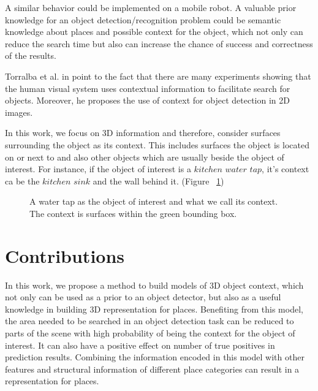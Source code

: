 A similar behavior could be implemented on a mobile robot. 
A valuable prior knowledge for an object detection/recognition problem could be semantic knowledge about places and possible context for the object, 
which not only can reduce the search time but also can increase the chance of success and correctness of the results.

Torralba et al. in \cite{eyeMovement} point to the fact that there are many experiments showing that the human visual system uses 
contextual information to facilitate search for objects. 
Moreover, he proposes the use of context for object detection in 2D images.

In this work, we focus on 3D information and therefore, consider surfaces surrounding the object as its context.
This includes surfaces the object is located on or next to and also other objects which are usually
beside the object of interest. 
For instance, if the object of interest is a $kitchen$ $water$ $tap$, it's context ca be the 
$kitchen$ $sink$ and the wall behind it. (Figure ~\ref{contextExample.figure})

\begin{figure}[t]
  \caption[Illustration of a sample Context.]
  {A water tap as the object of interest and what we call its context. The context is surfaces within the green 
  bounding box.}
  \label{contextExample.figure}
\end{figure}

\section {Contributions}
\label{Contributions.sec}

In this work, we propose a method to build models of 3D object context, which not only can be used as a prior to an 
object detector, but also as a useful knowledge in building 3D representation for places. 
Benefiting from this model, the area needed to be searched in an object detection task can be reduced to parts of the scene with high 
probability of being the context for the object of interest. 
It can also have a positive effect on number of true positives in prediction results. 
Combining the information encoded in this model with other features and structural information of different place categories can 
result in a representation for places.
 
